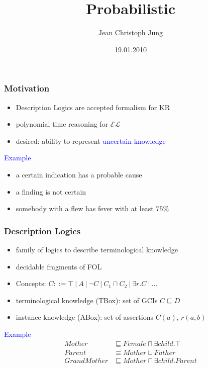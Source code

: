 \documentclass[draft]{beamer}
\title{Probabilistic \el}
\author{Jean Christoph Jung}
\date{19.01.2010}
\institute[TdKI Bremen]{AG Theoretische Grundlagen der K\"unstlichen Intelligenz \\ Universit\"at Bremen}
\newcommand{\el}{\ensuremath{\mathcal{EL}}\xspace}
\renewcommand{\emph}[1]{\textcolor{blue}{#1}}
\begin{document}
\begin{frame}
	\titlepage
\end{frame}


\begin{frame}
  \frametitle{Motivation}
  \begin{itemize}
    \item Description Logics are accepted formalism for KR
    \item polynomial time reasoning for \el
    \item desired: ability to represent \emph{uncertain knowledge}
  \end{itemize}

  \emph{Example} 
  \begin{itemize}
    \item a certain indication has a probable cause
    \item a finding is not certain
    \item somebody with a flew has fever with at least $75\%$
  \end{itemize}
\end{frame}


\begin{frame}
  \frametitle{Description Logics}
  \begin{itemize}
    \item family of logics to describe terminological knowledge
    \item decidable fragments of FOL
    \item 
      Concepts:	$C: :=\top~|~A~|~\neg C~|~C_1\sqcap C_2~|~\exists r.C~|~\ldots$
    \item 
      terminological knowledge (TBox): set of GCIs $C\sqsubseteq D$
    \item
      instance knowledge (ABox): set of assertions $C(a)$, $r(a,b)$
  \end{itemize}
  \emph{Example}
  \begin{align*}
    Mother &\sqsubseteq Female\sqcap\exists child.\top \\
    Parent &\equiv Mother\sqcup Father \\
    GrandMother &\sqsubseteq Mother \sqcap\exists child.Parent
  \end{align*}
\end{frame}
\end{document}
